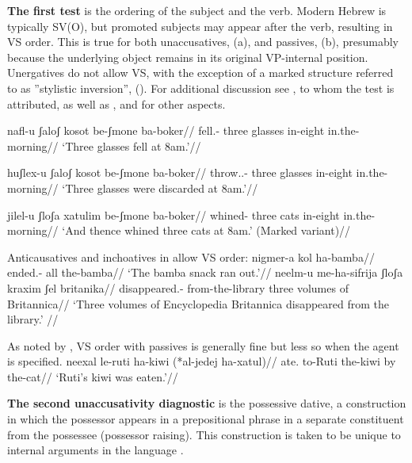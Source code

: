 \textbf{The first test} is the ordering of the subject and the verb. Modern Hebrew is typically SV(O), but promoted subjects may appear after the verb, resulting in VS order. This is true for both unaccusatives, (\nextx a), and passives, (\nextx b), presumably because the underlying object remains in its original VP-internal position. Unergatives do not allow VS, with the exception of a marked structure referred to as ''stylistic inversion'', (\anextx). For additional discussion see \cite{shlonsky87}, to whom the test is attributed, as well as \cite{shlonskydoron91}, \cite{borer95} and \cite{preminger10} for other aspects.

\pex
	\a  \begingl
	\gla{}nafl-u ʃaloʃ kosot be-ʃmone ba-boker//
	\glb fell.- three glasses in-eight in.the-morning//
	\glft `Three glasses fell at 8am.'//
	\endgl

	\a \begingl
	\gla{}huʃlex-u ʃaloʃ kosot be-ʃmone ba-boker//
	\glb throw..- three glasses in-eight in.the-morning//
	\glft `Three glasses were discarded at 8am.'//
	\endgl
\xe

\ex \begingl
	\gla{}\ljudge{\#}jilel-u ʃloʃa xatulim be-ʃmone ba-boker//
	\glb whined- three cats in-eight in.the-morning//
	\glft `And thence whined three cats at 8am.' (Marked variant)//
	\endgl
\xe

Anticausatives and inchoatives in {\tnif} allow VS order:
\pex 
	\a \begingl
		\gla nigmer-a kol ha-bamba//
		\glb ended.- all the-bamba//
		\glft `The bamba snack ran out.'//
		\endgl
	\a \begingl
		\gla neelm-u me-ha-sifrija ʃloʃa kraxim ʃel britanika//
		\glb disappeared.- from-the-library three volumes of Britannica//
		\glft `Three volumes of Encyclopedia Britannica disappeared from the library.' //
		\endgl
\xe

As noted by \cite[148]{shlonsky87}, VS order with passives is generally fine but less so when the agent is specified.
\ex \begingl
	\gla neexal le-ruti ha-kiwi (*al-jedej ha-xatul)//
	\glb ate. to-Ruti the-kiwi by the-cat//
	\glft `Ruti's kiwi was eaten.'//
	\endgl
\xe

\textbf{The second unaccusativity diagnostic} is the possessive dative, a construction in which the possessor appears in a prepositional phrase in a separate constituent from the possessee (possessor raising). This construction is taken to be unique to internal arguments in the language \citep{borergrodzinsky86}.

